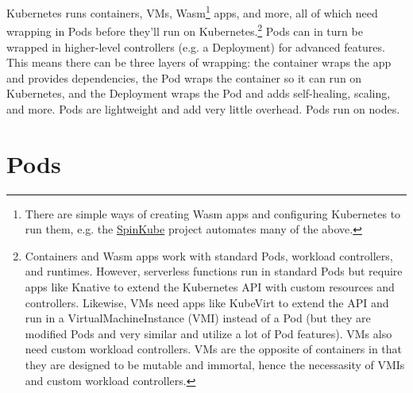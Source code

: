 \documentclass[table, xcdraw]{article}%
\begin{document}
Kubernetes runs containers, VMs, Wasm\footnote{There are simple ways of creating Wasm apps and configuring Kubernetes to run them, e.g. the \href{https://www.spinkube.dev}{SpinKube} project automates many of the above.} apps, and more, all of which need wrapping in Pods before they’ll run on Kubernetes.\footnote{Containers and Wasm apps work with standard Pods, workload controllers, and runtimes. However, serverless functions run in standard Pods but require apps like Knative to extend the Kubernetes API with custom resources and controllers. Likewise, VMs need apps like KubeVirt to extend the API and run in a VirtualMachineInstance (VMI) instead of a Pod (but they are modified Pods and very similar and utilize a lot of Pod features). VMs also need custom workload controllers. VMs are the opposite of containers in that they are designed to be mutable and immortal, hence the necessasity of VMIs and custom workload controllers.} Pods can in turn be wrapped in higher-level controllers (e.g. a Deployment) for advanced features. This means there can be three layers of wrapping: the container wraps the app and provides dependencies, the Pod wraps the container so it can run on Kubernetes, and the Deployment wraps the Pod and adds self-healing, scaling, and more. Pods are lightweight and add very little overhead. Pods run on nodes.

\section{Pods}
\end{document}
